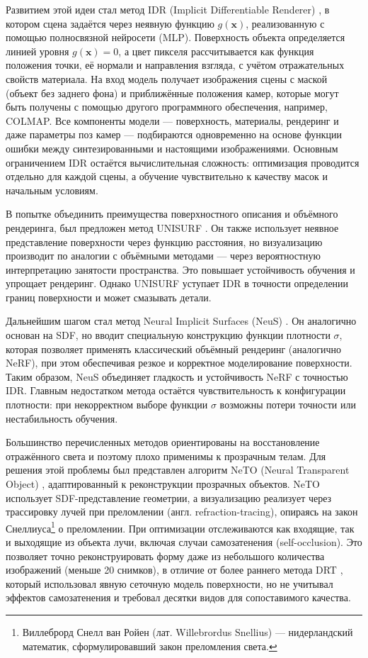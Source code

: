 Развитием этой идеи стал метод IDR (Implicit Differentiable Renderer)
\cite{yariv2020multiviewneuralsurfacereconstruction}, в котором сцена задаётся
через неявную функцию $g(\mathbf{x})$, реализованную с помощью полносвязной
нейросети (MLP). Поверхность объекта определяется линией уровня $g(\mathbf{x}) =
0$, а цвет пикселя рассчитывается как функция положения точки, её нормали и
направления взгляда, с учётом отражательных свойств материала. На вход модель
получает изображения сцены с маской (объект без заднего фона) и приближённые
положения камер, которые могут быть получены с помощью другого программного
обеспечения, например, COLMAP. Все компоненты модели — поверхность, материалы,
рендеринг и даже параметры поз камер — подбираются одновременно на основе
функции ошибки между синтезированными и настоящими изображениями. Основным
ограничением IDR остаётся вычислительная сложность: оптимизация проводится
отдельно для каждой сцены, а обучение чувствительно к качеству масок и начальным
условиям.

В попытке объединить преимущества поверхностного описания и объёмного
рендеринга, был предложен метод UNISURF
\cite{oechsle2021unisurfunifyingneuralimplicit}. Он также использует неявное
представление поверхности через функцию расстояния, но визуализацию производит
по аналогии с объёмными методами — через вероятностную интерпретацию занятости
пространства. Это повышает устойчивость обучения и упрощает рендеринг. Однако
UNISURF уступает IDR в точности определении границ поверхности и может смазывать
детали.

Дальнейшим шагом стал метод Neural Implicit Surfaces (NeuS)
\cite{wang2023neuslearningneuralimplicit}. Он аналогично основан на SDF, но вводит
специальную конструкцию функции плотности $\sigma$, которая позволяет применять
классический объёмный рендеринг (аналогично NeRF), при этом обеспечивая резкое и
корректное моделирование поверхности. Таким образом, NeuS объединяет гладкость и
устойчивость NeRF с точностью IDR. Главным недостатком метода остаётся
чувствительность к конфигурации плотности: при некорректном выборе функции
$\sigma$ возможны потери точности или нестабильность обучения.

Большинство перечисленных методов ориентированы на восстановление отражённого
света и поэтому плохо применимы к прозрачным телам. Для решения этой проблемы
был представлен алгоритм NeTO (Neural Transparent Object)
\cite{li2023netoneuralreconstructiontransparentobjects}, адаптированный к
реконструкции прозрачных объектов. NeTO использует SDF-представление геометрии,
а визуализацию реализует через трассировку
лучей при преломлении (англ. refraction-tracing), опираясь на закон Снеллиуса\footnote{Виллеброрд Снелл ван Ройен (лат.
Willebrordus Snellius) — нидерландский математик, сформулировавший закон
преломления света.} о преломлении. При оптимизации отслеживаются как входящие, так и
выходящие из объекта лучи, включая случаи самозатенения (self-occlusion). Это
позволяет точно реконструировать форму даже из небольшого количества изображений
(меньше 20 снимков), в отличие от более раннего метода DRT
\cite{Lyu_2020}, который использовал явную сеточную модель поверхности, но не
учитывал эффектов самозатенения и требовал десятки видов для сопоставимого
качества.

